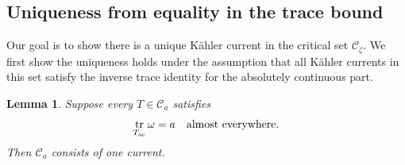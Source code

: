 \documentclass[reqno]{amsart}
\numberwithin{equation}{section}
\newtheorem{lemma}[theorem]{Lemma}
\theoremstyle{definition}
\DeclareMathOperator{\tr}{tr}
\newcommand{\cC}{\mathcal C}
\begin{document}
\subsection{Uniqueness from equality in the trace bound}
Our goal is to show there is a unique K\"ahler current in the critical set $\cC_\zeta$. We first show the uniqueness holds under the assumption that all K\"ahler currents in this set satisfy the inverse trace identity for the absolutely continuous part. 
\begin{lemma}\label{lem:trace-uniqueness}
 Suppose every $T\in \cC_a$ satisfies
\begin{equation}\label{eq:saturated-trace}
\tr_{T_{\rm ac}}\omega=a
\quad\hbox{almost everywhere}.
\end{equation}
Then $\mathcal C_a$ consists of one current. 
\end{lemma}
\end{document}
